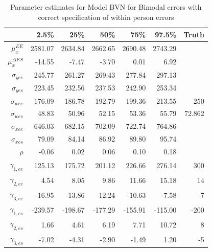 \documentclass[11pt]{article}\usepackage[]{graphicx}\usepackage[]{color}
\begin{document}
\begin{table}[ht]
\centering
\begin{tabular}{rrrrrr|r}
  \hline
 & 2.5\% & 25\% & 50\% & 75\% & 97.5\% & Truth \\
  \hline
$\mu_x^{EE}$ & 2581.07 & 2634.84 & 2662.65 & 2690.48 & 2743.29 \\ 
  $\mu_x^{\Delta ES}$ & -14.55 & -7.47 & -3.70 & 0.01 & 6.92 \\ 
  $\sigma_{yee}$ & 245.77 & 261.27 & 269.43 & 277.84 & 297.13 \\ 
  $\sigma_{yes}$ & 223.45 & 232.56 & 237.53 & 242.90 & 253.34 \\ 
  $\sigma_{wee}$ & 176.09 & 186.78 & 192.79 & 199.36 & 213.55 & 250\\ 
  $\sigma_{wes}$ & 48.83 & 50.96 & 52.15 & 53.36 & 55.79 & 72.862 \\ 
  $\sigma_{xee}$ & 646.03 & 682.15 & 702.09 & 722.74 & 764.86 \\ 
  $\sigma_{xes}$ & 79.09 & 84.14 & 86.92 & 89.80 & 95.74 \\ 
  $\rho$ & -0.06 & 0.02 & 0.06 & 0.10 & 0.18 \\ 
  $\gamma_{1,ee}$ & 125.13 & 175.72 & 201.12 & 226.66 & 276.14 & 300 \\ 
  $\gamma_{2,ee}$ & 4.54 & 8.05 & 9.86 & 11.66 & 15.18 & 14\\ 
  $\gamma_{3,ee}$ & -16.95 & -13.86 & -12.24 & -10.63 & -7.58 & -7 \\ 
  $\gamma_{1,es}$ & -239.57 & -198.67 & -177.29 & -155.91 & -115.00 & -200 \\ 
  $\gamma_{2,es}$ & 1.66 & 4.61 & 6.19 & 7.71 & 10.72 & 8\\ 
  $\gamma_{3,es}$ & -7.02 & -4.31 & -2.90 & -1.49 & 1.20 & -5\\ 
   \hline
\end{tabular}
\caption{Parameter estimates for Model BVN for Bimodal errors with correct specification of within person errors}
\label{mbvnbwpestimates}
\end{table}
\end{document}
